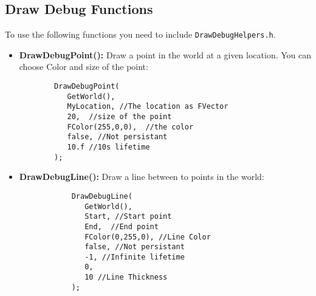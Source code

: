 \documentclass[10pt,a4paper]{article}
\begin{document}
\begin{multicols*}{2}
	\subsection{Draw Debug Functions}
	To use the following functions you need to include \verb|DrawDebugHelpers.h|.
	\begin{itemize}
		\item \textbf{DrawDebugPoint():} Draw a point in the world at a given location. You can choose Color and size of the point:
		\begin{verbatim}
		DrawDebugPoint(
		   GetWorld(), 
		   MyLocation, //The location as FVector
		   20,  //size of the point
		   FColor(255,0,0),  //the color
		   false, //Not persistant
		   10.f //10s lifetime
		);
		\end{verbatim}
		\item \textbf{DrawDebugLine():} Draw a line between to points in  the world:
		\begin{verbatim}
			DrawDebugLine(
			   GetWorld(), 
			   Start, //Start point
			   End,  //End point
			   FColor(0,255,0), //Line Color 
			   false, //Not persistant
			   -1, //Infinite lifetime
			   0,
			   10 //Line Thickness
			);
		\end{verbatim}
	\end{itemize}

	
	
	\doclicenseImage
\end{multicols*}
\end{document}
